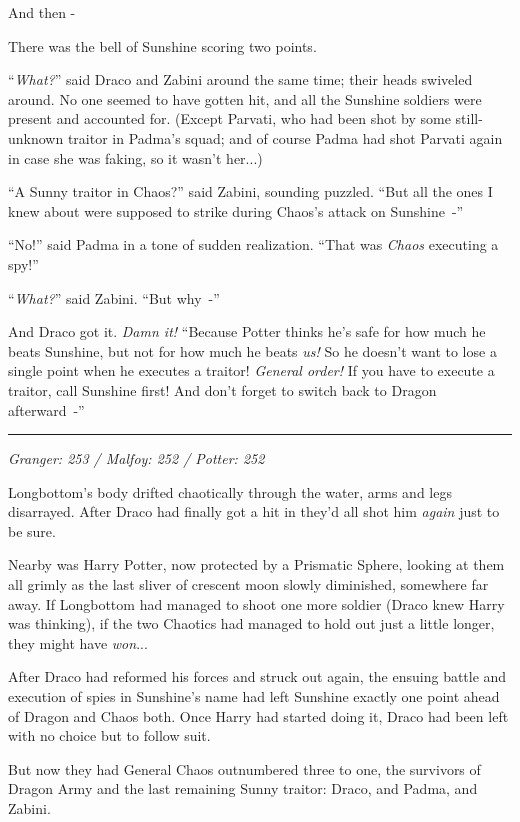 And then -

There was the bell of Sunshine scoring two points.

``\emph{What?}'' said Draco and Zabini around the same time; their heads swiveled around. No one seemed to have gotten hit, and all the Sunshine soldiers were present and accounted for. (Except Parvati, who had been shot by some still-unknown traitor in Padma's squad; and of course Padma had shot Parvati again in case she was faking, so it wasn't her...)

``A Sunny traitor in Chaos?'' said Zabini, sounding puzzled. ``But all the ones I knew about were supposed to strike during Chaos's attack on Sunshine~-''

``No!'' said Padma in a tone of sudden realization. ``That was \emph{Chaos} executing a spy!''

``\emph{What?}'' said Zabini. ``But why~-''

And Draco got it. \emph{Damn it!} ``Because Potter thinks he's safe for how much he beats Sunshine, but not for how much he beats \emph{us!} So he doesn't want to lose a single point when he executes a traitor! \emph{General order!} If you have to execute a traitor, call Sunshine first! And don't forget to switch back to Dragon afterward~-''

\begin{center}\rule{3in}{0.4pt}\end{center}

\emph{Granger: 253 / Malfoy: 252 / Potter: 252}

Longbottom's body drifted chaotically through the water, arms and legs disarrayed. After Draco had finally got a hit in they'd all shot him \emph{again} just to be sure.

Nearby was Harry Potter, now protected by a Prismatic Sphere, looking at them all grimly as the last sliver of crescent moon slowly diminished, somewhere far away. If Longbottom had managed to shoot one more soldier (Draco knew Harry was thinking), if the two Chaotics had managed to hold out just a little longer, they might have \emph{won}...

After Draco had reformed his forces and struck out again, the ensuing battle and execution of spies in Sunshine's name had left Sunshine exactly one point ahead of Dragon and Chaos both. Once Harry had started doing it, Draco had been left with no choice but to follow suit.

But now they had General Chaos outnumbered three to one, the survivors of Dragon Army and the last remaining Sunny traitor: Draco, and Padma, and Zabini.

